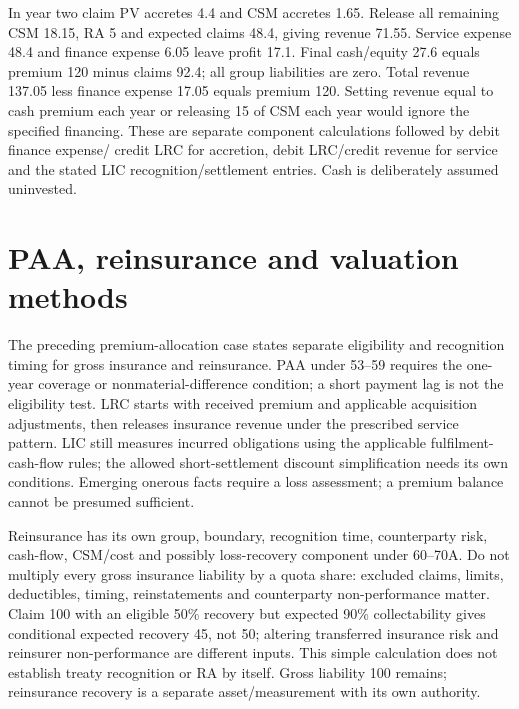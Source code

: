 In year two claim PV accretes 4.4 and CSM accretes 1.65. Release all remaining CSM 18.15, RA 5 and expected claims 48.4, giving revenue 71.55. Service expense 48.4 and finance expense 6.05 leave profit 17.1. Final cash/equity 27.6 equals premium 120 minus claims 92.4; all group liabilities are zero. Total revenue 137.05 less finance expense 17.05 equals premium 120. Setting revenue equal to cash premium each year or releasing 15 of CSM each year would ignore the specified financing. These are separate component calculations followed by debit finance expense/ credit LRC for accretion, debit LRC/credit revenue for service and the stated LIC recognition/settlement entries. Cash is deliberately assumed uninvested.

\hypertarget{paa-reinsurance-and-valuation-methods}{%
\section{PAA, reinsurance and valuation methods}\label{method-insurance-methods-paa-reinsurance-and-valuation-methods}}

The preceding premium-allocation case states separate eligibility and recognition timing for gross insurance and reinsurance. PAA under 53--59 requires the one-year coverage or nonmaterial-difference condition; a short payment lag is not the eligibility test. LRC starts with received premium and applicable acquisition adjustments, then releases insurance revenue under the prescribed service pattern. LIC still measures incurred obligations using the applicable fulfilment-cash-flow rules; the allowed short-settlement discount simplification needs its own conditions. Emerging onerous facts require a loss assessment; a premium balance cannot be presumed sufficient.

Reinsurance has its own group, boundary, recognition time, counterparty risk, cash-flow, CSM/cost and possibly loss-recovery component under 60--70A. Do not multiply every gross insurance liability by a quota share: excluded claims, limits, deductibles, timing, reinstatements and counterparty non-performance matter. Claim 100 with an eligible 50\% recovery but expected 90\% collectability gives conditional expected recovery 45, not 50; altering transferred insurance risk and reinsurer non-performance are different inputs. This simple calculation does not establish treaty recognition or RA by itself. Gross liability 100 remains; reinsurance recovery is a separate asset/measurement with its own authority.

